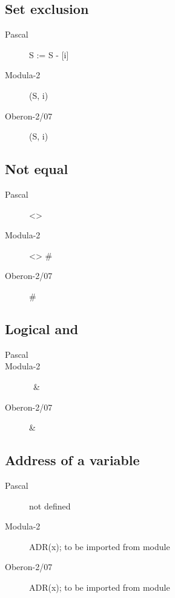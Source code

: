\documentclass[10pt]{article}
\begin{document}
\subsection{Set exclusion}
\begin{description}
    \item[Pascal]  S := S - [i]
    
    \item[Modula-2] \EXCL(S, i)
    
    \item[Oberon-2/07] \EXCL(S, i)
\end{description}

\subsection{Not equal}
\begin{description}
    \item[Pascal]  <>
    
    \item[Modula-2] <> \#
    
    \item[Oberon-2/07] \#
\end{description}

\subsection{Logical and}
\begin{description}
    \item[Pascal]  \AND
    
    \item[Modula-2] \AND\ \&
    
    \item[Oberon-2/07] \&
\end{description}

\subsection{Address of a variable}
\begin{description}
    \item[Pascal]  not defined
    
    \item[Modula-2] ADR(x); to be imported from module \SYSTEM
    
    \item[Oberon-2/07] ADR(x); to be imported from module \SYSTEM
\end{description}
\end{document}
